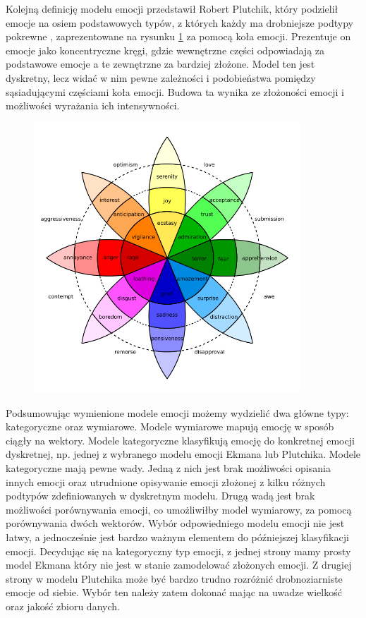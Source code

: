 Kolejną definicję modelu emocji przedstawił Robert Plutchik, który podzielił emocje na osiem podstawowych typów, z których każdy ma drobniejsze podtypy pokrewne \cite{plutchik1982psychoevolutionary}, zaprezentowane na rysunku \ref{rys:plutchik_wheel} za pomocą koła emocji. Prezentuje on emocje jako koncentryczne kręgi, gdzie wewnętrzne części odpowiadają za podstawowe emocje a te zewnętrzne za bardziej złożone. Model ten jest dyskretny, lecz widać w nim pewne zależności i podobieństwa pomiędzy sąsiadującymi częściami koła emocji. Budowa ta wynika ze złożoności emocji i możliwości wyrażania ich intensywności.

\begin{figure}[t]
\centering\includegraphics[width=10cm]{figures/plutchik-wheel.png}
\label{rys:plutchik_wheel}
\end{figure}

Podsumowując wymienione modele emocji możemy wydzielić dwa główne typy: kategoryczne oraz wymiarowe. Modele wymiarowe mapują emocję w sposób ciągły na wektory. Modele kategoryczne klasyfikują emocję do konkretnej emocji dyskretnej, np. jednej z wybranego modelu emocji Ekmana lub Plutchika. Modele kategoryczne mają pewne wady. Jedną z nich jest brak możliwości opisania innych emocji oraz utrudnione opisywanie emocji złożonej z kilku różnych podtypów zdefiniowanych w dyskretnym modelu. Drugą wadą jest brak możliwości porównywania emocji, co umożliwiłby model wymiarowy, za pomocą porównywania dwóch wektorów. Wybór odpowiedniego modelu emocji nie jest łatwy, a jednocześnie jest bardzo ważnym elementem do późniejszej klasyfikacji emocji. Decydując się na kategoryczny typ emocji, z jednej strony mamy prosty model Ekmana który nie jest w stanie zamodelować złożonych emocji. Z drugiej strony w modelu Plutchika może być bardzo trudno rozróżnić drobnoziarniste emocje od siebie. Wybór ten należy zatem dokonać mając na uwadze wielkość oraz jakość zbioru danych.

